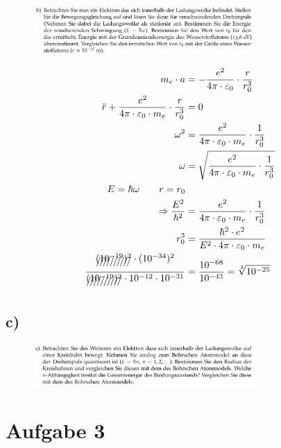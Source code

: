 \begin{figure}[H]
    \centering
    \includegraphics[width=0.75\textwidth]{images/Aufgabe_2b.jpg}
    \label{fig:6}
\end{figure}

    \begin{align}
        m_e \cdot a &= -\frac{e^2}{4\pi \cdot \varepsilon_0} \cdot \frac{r}{r_0^3}\\
        \ddot{r} + \frac{e^2}{4\pi \cdot \varepsilon_0 \cdot m_e} \cdot \frac{r}{r_0^3} &= 0\\
        \omega^2 &= \frac{e^2}{4\pi \cdot \varepsilon_0 \cdot m_e} \cdot \frac{1}{r_0^3}\\
        \omega &= \sqrt{\frac{e^2}{4\pi \cdot \varepsilon_0 \cdot m_e} \cdot \frac{1}{r_0^3}}\\
        E = \hbar \omega \qquad r = r_0\\
        \Rightarrow \frac{E^2}{\hbar^2} &= \frac{e^2}{4\pi \cdot \varepsilon_0 \cdot m_e} \cdot \frac{1}{r_0^3}\\
        r_0^3 &= \frac{\hbar^2 \cdot e^2}{E^2 \cdot 4\pi \cdot \varepsilon_0 \cdot m_e}\\
        \frac{\xout{(10^{-19})^2} \cdot (10^{-34})^2}{\xout{(10^{-19})^2} \cdot 10^{-12} \cdot 10^{-31}} &=
        \frac{10^{-68}}{10^{-43}} = \sqrt[3]{10^{-25}}
    \end{align}

\subsection{c)}

\begin{figure}[H]
    \centering
    \includegraphics[width=0.75\textwidth]{images/Aufgabe_2c.jpg}
    \label{fig:7}
\end{figure}

\section{Aufgabe 3}

